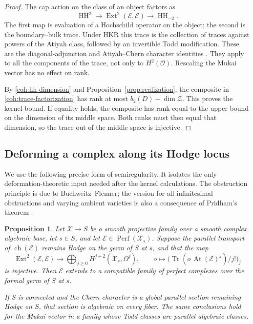 \documentclass[11pt]{article}
\numberwithin{equation}{section}
\newtheorem{proposition}[theorem]{Proposition}
\theoremstyle{definition}
\theoremstyle{remark}
\newcommand{\cO}{\mathcal O}
\DeclareMathOperator{\HH}{HH}
\DeclareMathOperator{\Ext}{Ext}
\DeclareMathOperator{\Perf}{Perf}
\DeclareMathOperator{\Tr}{Tr}
\DeclareMathOperator{\ch}{ch}
\begin{document}
\begin{proof}
The cap action on the class of an object factors as
\begin{equation}\label{coh:trace-factorization}
 \HH^2\longrightarrow\Ext^2(\mathcal E,\mathcal E)
       \longrightarrow\HH_{-2}.
\end{equation}
The first map is evaluation of a Hochschild operator on the object;
the second is the boundary--bulk trace.  Under HKR this trace is the
collection of traces against powers of the Atiyah class, followed by
an invertible Todd modification.  These are the diagonal-adjunction
and Atiyah--Chern character identities
\cite{CaldararuMukaiII,BuchweitzFlennerHH}.
They apply to all the components of the trace, not only to
\(H^2(\cO)\).  Rescaling the Mukai vector has no effect on rank.

By \eqref{coh:hh-dimension} and Proposition~\ref{prop:realization},
the composite in \eqref{coh:trace-factorization} has rank at most
\(b_2(D)-\dim\mathcal Z\).  This proves the kernel bound.  If
equality holds, the composite has rank equal to the upper bound on
the dimension of its middle space.  Both ranks must then equal that
dimension, so the trace out of the middle space is injective.
\end{proof}

\subsection{Deforming a complex along its Hodge locus}

We use the following precise form of semiregularity.  It isolates the
only deformation-theoretic input needed after the kernel calculations.
The obstruction principle is due to Buchweitz--Flenner; the version
for all infinitesimal obstructions and varying ambient varieties is
also a consequence of Pridham's theorem
\cite{BuchweitzFlennerSemiregularity,PridhamSemiregularity}.

\begin{proposition}\label{prop:semiregularity}
Let \(\mathscr X\to S\) be a smooth projective family over a smooth
complex algebraic base, let \(s\in S\), and let
\(\mathcal E\in\Perf(\mathscr X_s)\).  Suppose the parallel transport
of \(\ch(\mathcal E)\) remains Hodge on the germ of \(S\) at \(s\),
and that the map
\[
 \Ext^2(\mathcal E,\mathcal E)
 \longrightarrow\bigoplus_{j\ge0}H^{j+2}(\mathscr X_s,\Omega^j),
 \qquad o\longmapsto
  \bigl(\Tr(o\,\operatorname{At}(\mathcal E)^j)/j!\bigr)_j
\]
is injective.  Then \(\mathcal E\) extends to a compatible family of
perfect complexes over the formal germ of \(S\) at \(s\).

If \(S\) is connected and the Chern character is a global parallel
section remaining Hodge on \(S\), that section is algebraic on every
fiber.  The same conclusions hold for the Mukai vector in a family
whose Todd classes are parallel algebraic classes.
\end{proposition}
\end{document}
